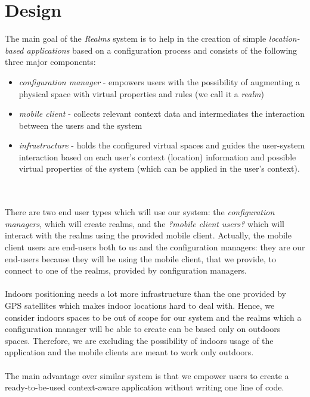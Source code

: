 \section{Design} %
\label{sec:design}
The main goal of the \emph{Realms} system is to help in the creation of simple \emph{location-based applications} based on a configuration process and consists of the following three major components:
\begin{itemize}
	\item \emph{configuration manager} - empowers users with the possibility of augmenting a physical space with virtual properties and rules (we call it a \emph{realm})
	\item \emph{mobile client} - collects relevant context data and intermediates the interaction between the users and the system
	\item \emph{infrastructure} - holds the configured virtual spaces and guides the user-system interaction based on each user's context (location) information and possible virtual properties of the system (which can be applied in the user's context).
\end{itemize}
\\\\
There are two end user types which will use our system: the \emph{configuration managers}, which will create realms, and the \emph{?mobile client users?} which will interact with the realms using the provided mobile client. Actually, the mobile client users are end-users both to us and the configuration managers: they are our end-users because they will be using the mobile client, that we provide, to connect to one of the realms, provided by configuration managers.
\\\\
Indoors positioning needs a lot more infrastructure than the one provided by GPS satellites which makes indoor locations hard to deal with. Hence, we consider indoors spaces to be out of scope for our system and the realms which a configuration manager will be able to create can be based only on outdoors spaces. Therefore, we are excluding the possibility of indoors usage of the application and the mobile clients are meant to work only outdoors.
\\\\
The main advantage over similar system is that we empower users to create a ready-to-be-used context-aware application without writing one line of code.\\
\\\\

